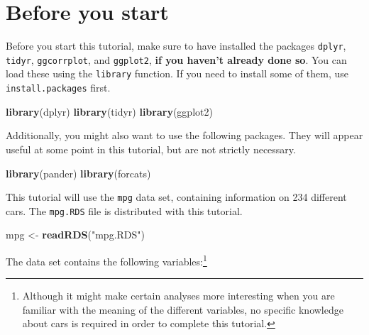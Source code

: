 \documentclass[]{tufte-book}
\newenvironment{Shaded}{}{}
\newcommand{\KeywordTok}[1]{\textcolor[rgb]{0.00,0.44,0.13}{\textbf{#1}}}
\newcommand{\NormalTok}[1]{#1}
\newcommand{\StringTok}[1]{\textcolor[rgb]{0.25,0.44,0.63}{#1}}
\begin{document}
\hypertarget{before-you-start-1}{%
\section{Before you start}\label{before-you-start-1}}

Before you start this tutorial, make sure to have installed the packages \texttt{dplyr}, \texttt{tidyr}, \texttt{ggcorrplot}, and \texttt{ggplot2}, \textbf{if you haven't already done so}. You can load these using the \texttt{library} function. If you need to install some of them, use \texttt{install.packages} first.

\begin{Shaded}
\begin{Highlighting}[]
\KeywordTok{library}\NormalTok{(dplyr)}
\KeywordTok{library}\NormalTok{(tidyr)}
\KeywordTok{library}\NormalTok{(ggplot2)}
\end{Highlighting}
\end{Shaded}

Additionally, you might also want to use the following packages. They will appear useful at some point in this tutorial, but are not strictly necessary.

\begin{Shaded}
\begin{Highlighting}[]
\KeywordTok{library}\NormalTok{(pander)}
\KeywordTok{library}\NormalTok{(forcats)}
\end{Highlighting}
\end{Shaded}

This tutorial will use the \texttt{mpg} data set, containing information on 234 different cars. The \texttt{mpg.RDS} file is distributed with this tutorial.

\begin{Shaded}
\begin{Highlighting}[]
\NormalTok{mpg <-}\StringTok{ }\KeywordTok{readRDS}\NormalTok{(}\StringTok{"mpg.RDS"}\NormalTok{)}
\end{Highlighting}
\end{Shaded}

The data set contains the following variables:\footnote{Although it might make certain analyses more interesting when you are familiar with the meaning of the different variables, no specific knowledge about cars is required in order to complete this tutorial.}
\end{document}
